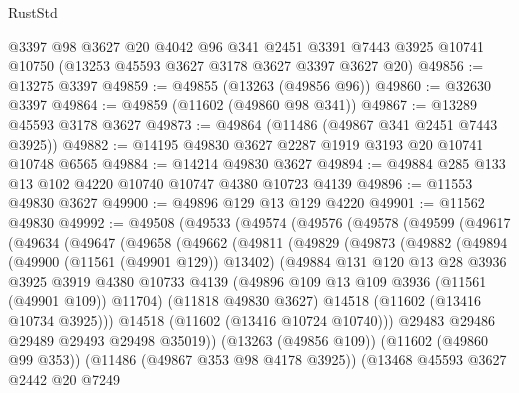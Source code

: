 \begin{lexlean}{RustStd}
\begin{coremodule}
    @3397
    @98
    @3627
    @20
    @4042
    @96
    @341
    @2451
    @3391
    @7443
    @3925
    @10741
    @10750
    (@13253 @45593 @3627 @3178 @3627 @3397 @3627 @20)
@49856 := @13275 @3397
@49859 := @49855 (@13263 (@49856 @96))
@49860 := @32630 @3397
@49864 := @49859 (@11602 (@49860 @98 @341))
@49867 := @13289 @45593 @3178 @3627
@49873 := @49864 (@11486 (@49867 @341 @2451 @7443 @3925))
@49882 := @14195 @49830 @3627 @2287 @1919 @3193 @20 @10741 @10748 @6565
@49884 := @14214 @49830 @3627
@49894 := @49884 @285 @133 @13 @102 @4220 @10740 @10747 @4380 @10723 @4139
@49896 := @11553 @49830 @3627
@49900 := @49896 @129 @13 @129 @4220
@49901 := @11562 @49830
@49992 := @49508
    (@49533
      (@49574
        (@49576
          (@49578
            (@49599
              (@49617
                (@49634
                  (@49647
                    (@49658
                      (@49662
                        (@49811
                          (@49829
                            (@49873
                              (@49882
                                (@49894
                                  (@49900 (@11561 (@49901 @129)) @13402)
                                  (@49884
                                    @131
                                    @120
                                    @13
                                    @28
                                    @3936
                                    @3925
                                    @3919
                                    @4380
                                    @10733
                                    @4139
                                    (@49896 @109 @13 @109 @3936 (@11561 (@49901 @109)) @11704)
                                    (@11818 @49830 @3627)
                                    @14518
                                    (@11602 (@13416 @10734 @3925)))
                                  @14518
                                  (@11602 (@13416 @10724 @10740)))
                                @29483
                                @29486
                                @29489
                                @29493
                                @29498
                                @35019))
                            (@13263 (@49856 @109))
                            (@11602 (@49860 @99 @353))
                            (@11486 (@49867 @353 @98 @4178 @3925))
                            (@13468
                              @45593
                              @3627
                              @2442
                              @20
                              @7249

\end{coremodule}
\end{lexlean}
